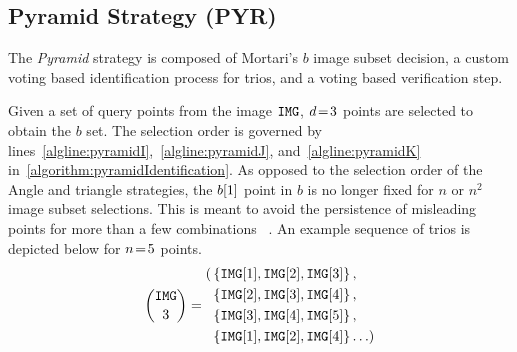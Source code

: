 \subsection{Pyramid Strategy (PYR)}\label{subsec:pyramidMethod}
The \textit{Pyramid} strategy is composed of Mortari's $b$ image subset decision, a custom voting based identification process for trios, and a voting based verification step.

Given a set of query points from the image $\texttt{IMG}$, $d \!=\! 3$ points are selected to obtain the $b$ set.
The selection order is governed by lines~\ref{algline:pyramidI},~\ref{algline:pyramidJ}, and~\ref{algline:pyramidK} in~\autoref{algorithm:pyramidIdentification}.
As opposed to the selection order of the Angle and triangle strategies, the $b[1]$ point in $b$ is no longer fixed for $n$ or $n^2$ image subset selections.
This is meant to avoid the persistence of misleading points for more than a few combinations
~\cite{mortari:pyramidIdentification}.
An example sequence of trios is depicted below for $n \!=\! 5$ points.
\begin{equation}
    \binom{\texttt{IMG}}{3} = 
    \begin{aligned}
    	( &\left\{ \texttt{IMG}[1], \texttt{IMG}[2], \texttt{IMG}[3] \right\}, \\
    	&\left\{ \texttt{IMG}[2], \texttt{IMG}[3], \texttt{IMG}[4] \right\}, \\
        &\left\{ \texttt{IMG}[3], \texttt{IMG}[4], \texttt{IMG}[5] \right\}, \\
        &\left\{ \texttt{IMG}[1], \texttt{IMG}[2], \texttt{IMG}[4]  \right\}\ldots )
    \end{aligned}
\end{equation}

